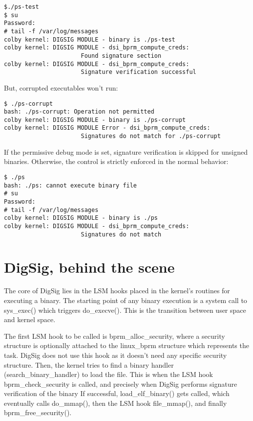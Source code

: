 \documentclass{article}
\begin{document}
\small
\begin{verbatim} 
$./ps-test
$ su
Password:
# tail -f /var/log/messages
colby kernel: DIGSIG MODULE - binary is ./ps-test
colby kernel: DIGSIG MODULE - dsi_bprm_compute_creds:
                      Found signature section
colby kernel: DIGSIG MODULE - dsi_bprm_compute_creds:
                      Signature verification successful
\end{verbatim}
\normalsize

But, corrupted executables won't run:
\small
\begin{verbatim} 
$ ./ps-corrupt
bash: ./ps-corrupt: Operation not permitted 
colby kernel: DIGSIG MODULE - binary is ./ps-corrupt
colby kernel: DIGSIG MODULE Error - dsi_bprm_compute_creds:
                      Signatures do not match for ./ps-corrupt
\end{verbatim} 
\normalsize

If the permissive debug mode is set, signature verification is skipped
for unsigned binaries.  Otherwise, the control is strictly enforced in
the normal behavior:

\small
\begin{verbatim} 
$ ./ps
bash: ./ps: cannot execute binary file 
# su 
Password: 
# tail -f /var/log/messages
colby kernel: DIGSIG MODULE - binary is ./ps
colby kernel: DIGSIG MODULE - dsi_bprm_compute_creds:
                      Signatures do not match
\end{verbatim}
\normalsize

\section{DigSig, behind the scene}

The core of DigSig lies in the LSM hooks placed in the kernel's
routines for executing a binary. The starting point of any binary
execution is a system call to sys\_exec() which triggers
do\_execve(). This is the transition between user space and kernel
space.

The first LSM hook to be called is bprm\_alloc\_security,
where a security structure is optionally attached to the
linux\_bprm structure which represents the task. DigSig
does not use this hook as it doesn't need any specific
security structure.
Then, the kernel tries to find a binary handler 
(search\_binary\_handler) to load the file. This is
when the LSM hook bprm\_check\_security is called, and precisely
when DigSig performs signature verification of the binary
If successful, load\_elf\_binary() gets called,
which eventually calls do\_mmap(), then the LSM hook
file\_mmap(), and finally bprm\_free\_security().
\end{document}
